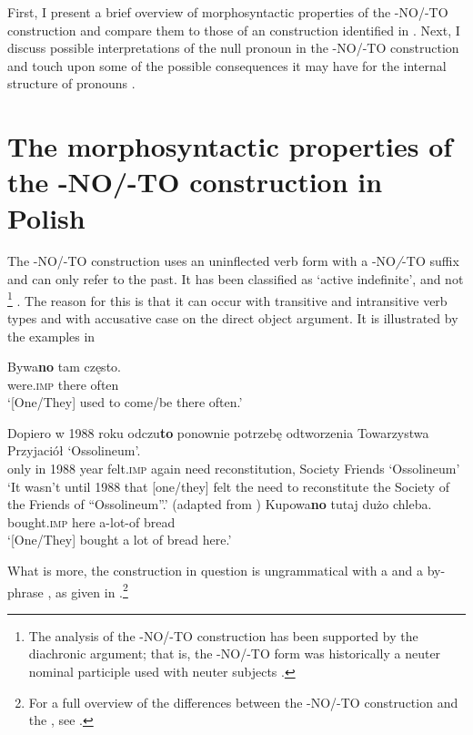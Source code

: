 \documentclass[output=paper]{LSP/langsci}
\begin{document}
First, I present a brief overview of morphosyntactic properties of the  -NO/-TO construction and compare them to those of an   construction identified in \citet{FassiFehri2009}. Next, I discuss possible interpretations of the null pronoun in the -NO/-TO construction and touch upon some of the possible consequences it may have for the internal structure of pronouns \citep{HarleyRitter2002}.

\section{The morphosyntactic properties of the -NO/-TO construction in Polish}

The -NO/-TO construction uses an uninflected verb form with a -NO\textit{/}{}-TO\textit{} suffix and can only refer to the past. It has been classified as ‘active indefinite’, and not  \citep{Kibort2004,Dziwirek1994,Śpiewak2000} \footnote{The  analysis of the -NO/-TO construction has been supported by the diachronic argument; that is, the -NO/-TO form was historically a neuter nominal  participle used with neuter  subjects \citep{Siewierska1988,Kibort2004}.} . The reason for this is that it can occur with transitive and intransitive verb types and with accusative case on the direct object argument. It is illustrated by the examples in 

\ea\label{ex:5.krzek}
   \ea
\gll Bywa\textbf{no} tam     często.\\
      were.\textsc{imp}  there   often\\
\glt ‘[One/They] used to come/be there often.’

    \ex
\gll  Dopiero w 1988   roku odczu\textbf{to}     ponownie potrzebę   odtworzenia Towarzystwa   Przyjaciół   ‘Ossolineum’.\\
only      in 1988   year felt.\textsc{imp}     again        need      reconstitution, Society             Friends     ‘Ossolineum’\\
\glt ‘It wasn’t until 1988 that [one/they] felt the need to reconstitute the Society of the Friends of “Ossolineum”.’                 (adapted from \citealt[259]{Kibort2004})
    \ex
\gll Kupowa\textbf{no}     tutaj   dużo      chleba.\\
     bought.\textsc{imp}   here    a-lot-of  bread\\
\glt      ‘[One/They] bought a lot of bread here.’
\z
\z

What is more, the construction in question is ungrammatical with a   and a  by-phrase \citep{Lavine2005}, as given in .\footnote{For a full overview of the differences between the -NO/-TO construction and the , see \citet{Kibort2004}.} 
\end{document}
